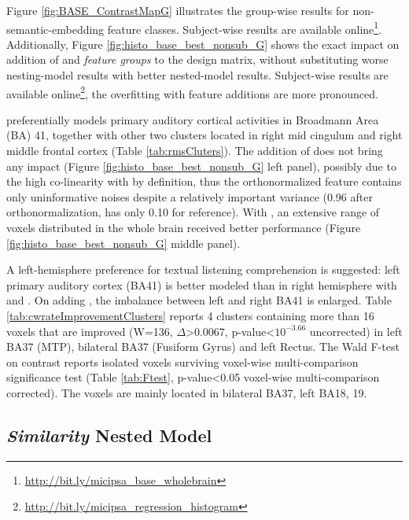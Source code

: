 Figure \ref{fig:BASE_ContrastMapG} illustrates the group-wise results for non-semantic-embedding feature classes. Subject-wise results are available online\footnote{\url{http://bit.ly/micipsa_base_wholebrain}}. Additionally, Figure \ref{fig:histo_base_best_nonsub_G} shows the exact impact on addition of  and  \emph{feature groups} to the design matrix, without substituting worse nesting-model results with better nested-model results. Subject-wise results are available online\footnote{\url{http://bit.ly/micipsa_regression_histogram}}, the overfitting with feature additions are more pronounced.

 preferentially models primary auditory cortical activities in Broadmann Area (BA) 41, together with other two clusters located in right mid cingulum and right middle frontal cortex (Table \ref{tab:rmsCluters}). The addition of  does not bring any impact (Figure \ref{fig:histo_base_best_nonsub_G} left panel), possibly due to the high co-linearity with  by definition, thus the orthonormalized feature contains only uninformative noises despite a relatively important variance (0.96 after orthonormalization,  has only 0.10 for reference). With , an extensive range of voxels distributed in the whole brain received better performance (Figure \ref{fig:histo_base_best_nonsub_G} middle panel). 

A left-hemisphere preference for textual listening comprehension is suggested: left primary auditory cortex (BA41) is better modeled than in right hemisphere with  and . On adding , the imbalance between left and right BA41 is enlarged. Table \ref{tab:cwrateImprovementClusters} reports 4 clusters containing more than 16 voxels that are improved (W=136, \(\Delta\)>0.0067, p-value<\(10^{-3.66}\) uncorrected) in left BA37 (MTP), bilateral BA37 (Fusiform Gyrus) and left Rectus. The Wald F-test on  contrast reports isolated voxels surviving voxel-wise multi-comparison significance test (Table \ref{tab:Ftest}, p-value<0.05 voxel-wise multi-comparison corrected). The voxels are mainly located in bilateral BA37, left BA18, 19. 


\subsection{\emph{Similarity} Nested Model}

